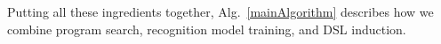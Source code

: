 \documentclass{article}
\newcommand{\system}{\textsc{CoCoSea}~}
\newcommand{\probability}{\mathds{P}} %
\begin{document}
Putting all these ingredients together, Alg.~\ref{mainAlgorithm} describes how we combine program search,
recognition model training, and DSL induction.

\end{document}
